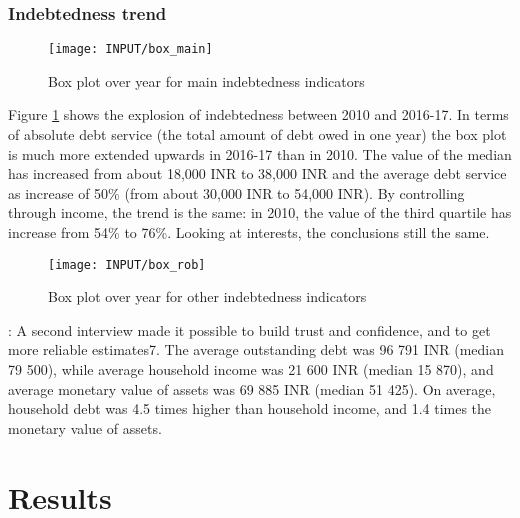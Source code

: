 \documentclass[a4paper, 11pt, onecolumn]{article}
\begin{document}
		\subsubsection{Indebtedness trend}

\begin{figure}[ht]
\raggedright
\texttt{[image: INPUT/box\_main]}
\caption{Box plot over year for main indebtedness indicators}
\label{figure:debttrendmain}
\end{figure}
Figure \ref{figure:debttrendmain} shows the explosion of indebtedness between 2010 and 2016-17.
In terms of absolute debt service (the total amount of debt owed in one year) the box plot is much more extended upwards in 2016-17 than in 2010.
The value of the median has increased from about 18,000 INR to 38,000 INR and the average debt service as increase of 50\% (from about 30,000 INR to 54,000 INR).
By controlling through income, the trend is the same: in 2010, the value of the third quartile has increase from 54\% to 76\%.
Looking at interests, the conclusions still the same.


\begin{figure}[ht]
\raggedright
\texttt{[image: INPUT/box\_rob]}
\caption{Box plot over year for other indebtedness indicators}
\label{figure:debttrendrob}
\end{figure}

\cite{Guerin2014a} : A second interview made it
possible to build trust and confidence, and to get more reliable estimates7. The average
outstanding debt was 96 791 INR (median 79 500), while average household income was
21 600 INR (median 15 870), and average monetary value of assets was 69 885 INR (median
51 425). On average, household debt was 4.5 times higher than household income, and 1.4
times the monetary value of assets.


\newpage
\section{Results}

\clearpage
\newpage
\end{document}

